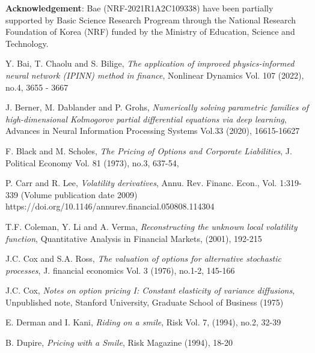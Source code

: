 \documentclass[11pt,reqno]{article}
\numberwithin{equation}{section}
\begin{document}
{{\bf Acknowledgement}:
Bae (NRF-2021R1A2C109338)
have been partially supported by Basic Science Research Progream
 through the National Research Foundation of Korea (NRF) funded by the Ministry
of Education, Science and Technology.

\begin{thebibliography}{99}

Y. Bai, T. Chaolu and S. Bilige, 
{\it The application of improved physics-informed neural network (IPINN) method in finance},
Nonlinear Dynamics Vol. {107} (2022), no.4, 3655 - 3667

J. Berner, M.  Dablander and P. Grohs, 
{\it Numerically solving parametric families of high-dimensional Kolmogorov
 partial differential equations via deep learning},
Advances in Neural Information Processing Systems Vol.{33} (2020), 
16615-16627

F. Black and M. Scholes,
{\it The Pricing of Options and Corporate Liabilities},
J. Political Economy Vol. {81} (1973), no.3, 637-54,

 P. Carr and R. Lee, {\it Volatility derivatives}, 
Annu. Rev. Financ. Econ., 
Vol. 1:319-339 (Volume publication date 2009)
https://doi.org/10.1146/annurev.financial.050808.114304

T.F. Coleman, Y. Li and A. Verma,
{\it Reconstructing the unknown local volatility function},
Quantitative Analysis in Financial Markets, (2001), 192-215

J.C. Cox and S.A. Ross,
{\it The valuation of options for alternative stochastic processes},
J. financial economics Vol. {3} (1976), no.1-2, 145-166

J.C. Cox, %
{\it Notes on option pricing I: Constant elasticity of variance diffusions},
Unpublished note, Stanford University, Graduate School of Business (1975)

E. Derman and I. Kani,
{\it Riding on a smile}, Risk Vol. {7}, (1994), no.2, 32-39

B. Dupire, %
{\it Pricing with a Smile},
Risk Magazine (1994),
18-20


\end{thebibliography}}
\end{document}
